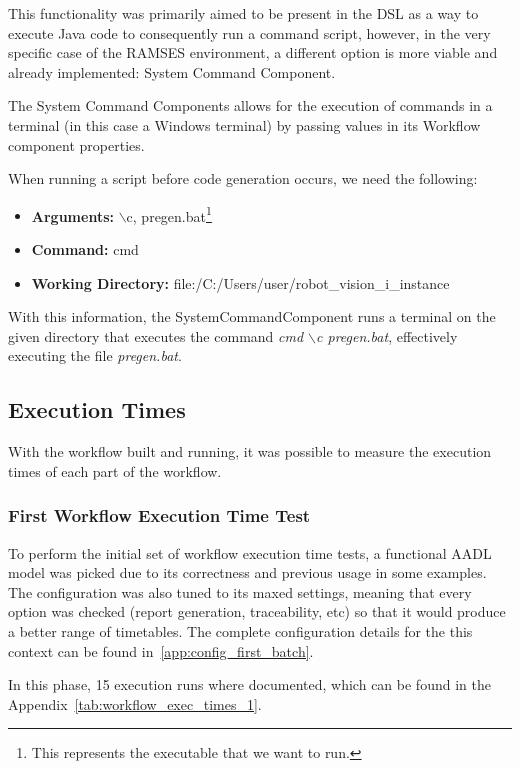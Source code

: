 This functionality was primarily aimed to be present in the \gls{DSL} as a way to execute Java code to consequently run a command script, however, in the very specific case of the \gls{RAMSES} environment, a different option is more viable and already implemented: System Command Component.

The System Command Components allows for the execution of commands in a terminal (in this case a Windows terminal) by passing values in its Workflow component properties.

When running a script before code generation occurs, we need the following:

\begin{itemize} 
	\item \textbf{Arguments: } $\backslash$c, pregen.bat\footnote{This represents the executable that we want to run.}
	\item \textbf{Command: } cmd
	\item \textbf{Working Directory: } file:/C:/Users/user/robot\_vision\_i\_instance
\end{itemize}

With this information, the SystemCommandComponent runs a terminal on the given directory that executes the command \textit{cmd $\backslash$c pregen.bat}, effectively executing the file \textit{pregen.bat}.


\subsection{Execution Times}
\label{sec:exec_times}

With the workflow built and running, it was possible to measure the execution times of each part of the workflow.

\subsubsection{First Workflow Execution Time Test}
\label{sec:exec_times_v1}

To perform the initial set of workflow execution time tests, a functional \gls{AADL} model was picked due to its correctness and previous usage in some examples. The configuration was also tuned to its maxed settings, meaning that every option was checked (report generation, traceability, etc) so that it would produce a better range of timetables. The complete configuration details for the this context can be found in~\ref{app:config_first_batch}.

In this phase, 15 execution runs where documented, which can be found in the Appendix~\ref{tab:workflow_exec_times_1}.

